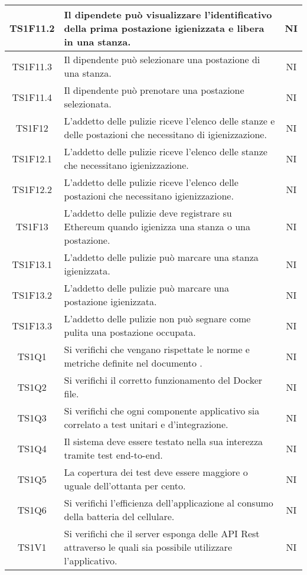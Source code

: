 \begin{center}
\begin{longtable}{|c|p{10cm}|c|}
			\hline
			TS1F11.2 & Il dipendete può visualizzare l'identificativo della prima postazione igienizzata e libera in una stanza. & NI \\	
			\hline
			TS1F11.3 & Il dipendente può selezionare una postazione di una stanza. & NI \\	
			\hline
			TS1F11.4 & Il dipendente può prenotare una postazione selezionata. & NI \\	
			\hline
			TS1F12 & L'addetto delle pulizie riceve l'elenco delle stanze e delle postazioni che necessitano di igienizzazione. & NI \\	
			\hline
			TS1F12.1 & L'addetto delle pulizie riceve l'elenco delle stanze che necessitano igienizzazione. & NI \\	
			\hline
			TS1F12.2 & L'addetto delle pulizie riceve l'elenco delle postazioni che necessitano igienizzazione. & NI \\	
			\hline
			TS1F13 & L'addetto delle pulizie deve registrare su Ethereum quando igienizza una stanza o una postazione. & NI \\	
			\hline
			TS1F13.1 & L'addetto delle pulizie può marcare una stanza igienizzata. & NI \\	
			\hline
			TS1F13.2 & L'addetto delle pulizie può marcare una postazione igienizzata. & NI \\	
			\hline
			TS1F13.3 & L'addetto delle pulizie non può segnare come pulita una postazione occupata. & NI \\	
			\hline
			TS1Q1 & Si verifichi che vengano rispettate le norme e metriche definite nel documento \dext{Piano di Qualifica v. 1.0.0}. & NI \\	
			\hline			
			TS1Q2 & Si verifichi il corretto funzionamento del Docker file. & NI \\	
			\hline	
			TS1Q3 & Si verifichi che ogni componente applicativo sia correlato a test unitari e d'integrazione. & NI \\	
			\hline
			TS1Q4 & Il sistema deve essere testato nella sua interezza tramite test end-to-end. & NI \\	
			\hline
			TS1Q5 & La copertura dei test deve essere maggiore o uguale dell'ottanta per cento. & NI \\	
			\hline
			TS1Q6 & Si verifichi l'efficienza dell'applicazione al consumo della batteria del cellulare. & NI \\	
			\hline
			TS1V1 & Si verifichi che il server esponga delle API Rest attraverso le quali sia possibile utilizzare l'applicativo. & NI \\	

\end{longtable}
\end{center}
